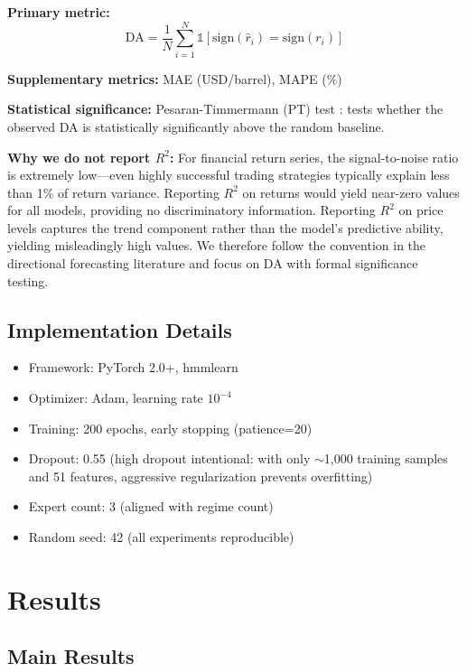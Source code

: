 \documentclass[3p,times]{elsarticle}
\begin{document}
\textbf{Primary metric:}
\begin{equation}
\text{DA} = \frac{1}{N}\sum_{i=1}^{N} \mathbb{1}[\text{sign}(\hat{r}_i) = \text{sign}(r_i)]
\end{equation}

\textbf{Supplementary metrics:} MAE (USD/barrel), MAPE (\%)

\textbf{Statistical significance:} Pesaran-Timmermann (PT) test \cite{pesaran1992}: tests whether the observed DA is statistically significantly above the random baseline.

\textbf{Why we do not report $R^2$:} For financial return series, the signal-to-noise ratio is extremely low---even highly successful trading strategies typically explain less than 1\% of return variance. Reporting $R^2$ on returns would yield near-zero values for all models, providing no discriminatory information. Reporting $R^2$ on price levels captures the trend component rather than the model's predictive ability, yielding misleadingly high values. We therefore follow the convention in the directional forecasting literature and focus on DA with formal significance testing.

\subsection{Implementation Details}

\begin{itemize}
\item Framework: PyTorch 2.0+, hmmlearn
\item Optimizer: Adam, learning rate $10^{-4}$
\item Training: 200 epochs, early stopping (patience=20)
\item Dropout: 0.55 (high dropout intentional: with only $\sim$1,000 training samples and 51 features, aggressive regularization prevents overfitting)
\item Expert count: 3 (aligned with regime count)
\item Random seed: 42 (all experiments reproducible)
\end{itemize}

\section{Results}
\label{sec:results}

\subsection{Main Results}
\label{sec:main}
\end{document}

